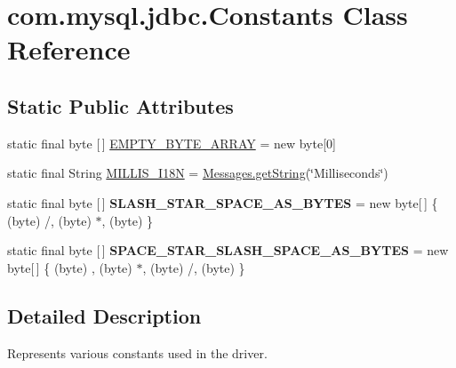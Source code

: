 \hypertarget{classcom_1_1mysql_1_1jdbc_1_1_constants}{}\section{com.\+mysql.\+jdbc.\+Constants Class Reference}
\label{classcom_1_1mysql_1_1jdbc_1_1_constants}
\subsection*{Static Public Attributes}
\begin{DoxyCompactItemize}
\item 
static final byte \mbox{[}$\,$\mbox{]} \mbox{\hyperlink{classcom_1_1mysql_1_1jdbc_1_1_constants_ae6f611858f631366604c7fab818560f8}{E\+M\+P\+T\+Y\+\_\+\+B\+Y\+T\+E\+\_\+\+A\+R\+R\+AY}} = new byte\mbox{[}0\mbox{]}
\item 
static final String \mbox{\hyperlink{classcom_1_1mysql_1_1jdbc_1_1_constants_af4c9f4ec44a1a2ddfc51f06fc081af08}{M\+I\+L\+L\+I\+S\+\_\+\+I18N}} = \mbox{\hyperlink{classcom_1_1mysql_1_1jdbc_1_1_messages_ad6d3160126b07ad0d56d97250bed8412}{Messages.\+get\+String}}(\char`\"{}Milliseconds\char`\"{})
\item 
\mbox{\label{classcom_1_1mysql_1_1jdbc_1_1_constants_a8a90d62ba09344cd62ac5edbd23139f5}} 
static final byte \mbox{[}$\,$\mbox{]} {\bfseries S\+L\+A\+S\+H\+\_\+\+S\+T\+A\+R\+\_\+\+S\+P\+A\+C\+E\+\_\+\+A\+S\+\_\+\+B\+Y\+T\+ES} = new byte\mbox{[}$\,$\mbox{]} \{ (byte) \textquotesingle{}/\textquotesingle{}, (byte) \textquotesingle{}$\ast$\textquotesingle{}, (byte) \textquotesingle{} \textquotesingle{} \}
\item 
\mbox{\label{classcom_1_1mysql_1_1jdbc_1_1_constants_a34ffe7cba4bbe51ad3d6599d771ba1f5}} 
static final byte \mbox{[}$\,$\mbox{]} {\bfseries S\+P\+A\+C\+E\+\_\+\+S\+T\+A\+R\+\_\+\+S\+L\+A\+S\+H\+\_\+\+S\+P\+A\+C\+E\+\_\+\+A\+S\+\_\+\+B\+Y\+T\+ES} = new byte\mbox{[}$\,$\mbox{]} \{ (byte) \textquotesingle{} \textquotesingle{}, (byte) \textquotesingle{}$\ast$\textquotesingle{}, (byte) \textquotesingle{}/\textquotesingle{}, (byte) \textquotesingle{} \textquotesingle{} \}
\end{DoxyCompactItemize}


\subsection{Detailed Description}
Represents various constants used in the driver. 

